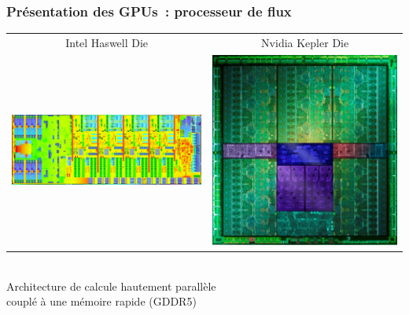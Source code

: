\begin{frame}
  \frametitle{Présentation des GPUs~: processeur de flux}
  \begin{center}
    \begin{tabular}{cc}
      Intel Haswell Die & Nvidia Kepler Die \\[5mm]
      \includegraphics[height=.3\textheight]{images/intel-haswell-die.jpg} &
      \includegraphics[height=.3\textheight]{images/nvidia-kepler-die.jpg}
    \end{tabular} \\[5mm]
    Architecture de calcule hautement parallèle \\
    couplé à une mémoire rapide (GDDR5)
  \end{center}
  \begin{tikzpicture}[remember picture, overlay, mystyle/.style={-latex, line width=1pt}] %

\end{tikzpicture}
\end{frame}

